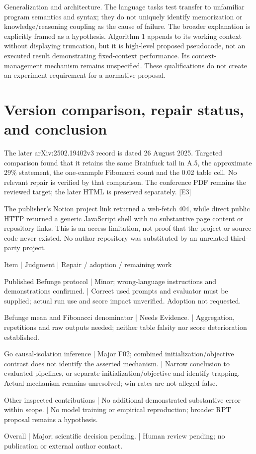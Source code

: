 \documentclass[10pt]{article}
\begin{document}
Generalization and architecture. The language tasks test transfer to unfamiliar program semantics and syntax; they do not uniquely identify memorization or knowledge/reasoning coupling as the cause of failure. The broader explanation is explicitly framed as a hypothesis. Algorithm 1 appends to its working context without displaying truncation, but it is high-level proposed pseudocode, not an executed result demonstrating fixed-context performance. Its context-management mechanism remains unspecified. These qualifications do not create an experiment requirement for a normative proposal.\par
\section*{Version comparison, repair status, and conclusion}
The later arXiv:2502.19402v3 record is dated 26 August 2025. Targeted comparison found that it retains the same Brainfuck tail in A.5, the approximate 29\% statement, the one-example Fibonacci count and the 0.02 table cell. No relevant repair is verified by that comparison. The conference PDF remains the reviewed target; the later HTML is preserved separately. [E3]\par
The publisher’s Notion project link returned a web-fetch 404, while direct public HTTP returned a generic JavaScript shell with no substantive page content or repository links. This is an access limitation, not proof that the project or source code never existed. No author repository was substituted by an unrelated third-party project.\par
Item | Judgment | Repair / adoption / remaining work\par
Published Befunge protocol | Minor; wrong-language instructions and demonstrations confirmed. | Correct used prompts and evaluator must be supplied; actual run use and score impact unverified. Adoption not requested.\par
Befunge mean and Fibonacci denominator | Needs Evidence. | Aggregation, repetitions and raw outputs needed; neither table falsity nor score deterioration established.\par
Go causal-isolation inference | Major F02; combined initialization/objective contrast does not identify the asserted mechanism. | Narrow conclusion to evaluated pipelines, or separate initialization/objective and identify trapping. Actual mechanism remains unresolved; win rates are not alleged false.\par
Other inspected contributions | No additional demonstrated substantive error within scope. | No model training or empirical reproduction; broader RPT proposal remains a hypothesis.\par
Overall | Major; scientific decision pending. | Human review pending; no publication or external author contact.\par
\end{document}
